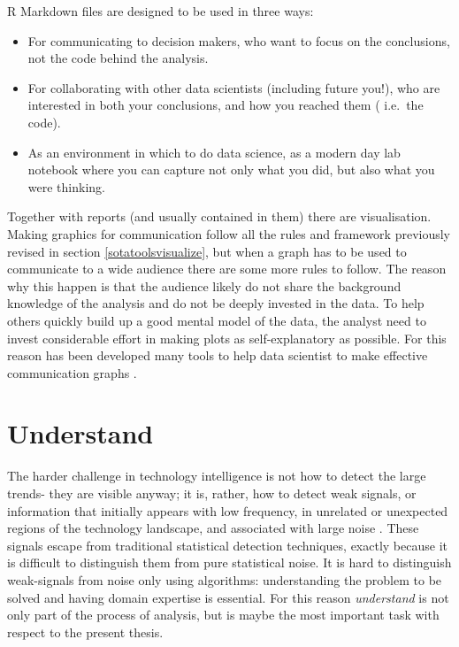 \documentclass[]{book}
\theoremstyle{definition}
\theoremstyle{definition}
\theoremstyle{definition}
\theoremstyle{remark}
\begin{document}
R Markdown files are designed to be used in three ways:

\begin{itemize}
\item
  For communicating to decision makers, who want to focus on the
  conclusions, not the code behind the analysis.
\item
  For collaborating with other data scientists (including future you!),
  who are interested in both your conclusions, and how you reached them
  ( i.e.~the code).
\item
  As an environment in which to do data science, as a modern day lab
  notebook where you can capture not only what you did, but also what
  you were thinking.
\end{itemize}

Together with reports (and usually contained in them) there are
visualisation. Making graphics for communication follow all the rules
and framework previously revised in section \ref{sotatoolsvisualize},
but when a graph has to be used to communicate to a wide audience there
are some more rules to follow. The reason why this happen is that the
audience likely do not share the background knowledge of the analysis
and do not be deeply invested in the data. To help others quickly build
up a good mental model of the data, the analyst need to invest
considerable effort in making plots as self-explanatory as possible. For
this reason has been developed many tools to help data scientist to make
effective communication
graphs\citep{wickham2016ggplot2, shiny2017, plotly2017, ggprah2018, ICWSM09154}
.

\section{Understand}\label{sotadocumentsunderstand}

The harder challenge in technology intelligence is not how to detect the
large trends- they are visible anyway; it is, rather, how to detect weak
signals, or information that initially appears with low frequency, in
unrelated or unexpected regions of the technology landscape, and
associated with large noise \citep{apreda2016functional}. These signals
escape from traditional statistical detection techniques, exactly
because it is difficult to distinguish them from pure statistical noise.
It is hard to distinguish weak-signals from noise only using algorithms:
understanding the problem to be solved and having domain expertise is
essential. For this reason \emph{understand} is not only part of the
process of analysis, but is maybe the most important task with respect
to the present thesis.
\end{document}
